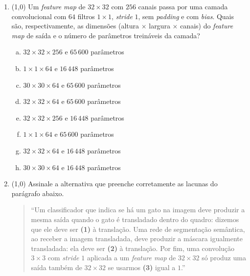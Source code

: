 \documentclass[11pt,a4paper]{article}
\begin{document}
\begin{enumerate}[1)]

\item (1{,}0) Um \textit{feature map} de $32 \times 32$ com $256$ canais passa por uma camada convolucional com $64$ filtros $1 \times 1$, \textit{stride} $1$, sem \textit{padding} e com \textit{bias}. Quais são, respectivamente, as dimensões (altura $\times$ largura $\times$ canais) do \textit{feature map} de saída e o número de parâmetros treináveis da camada?
\begin{enumerate}[a)]
    \item $32 \times 32 \times 256$ e $65\,600$ parâmetros
    \item $1 \times 1 \times 64$ e $16\,448$ parâmetros
    \item $30 \times 30 \times 64$ e $65\,600$ parâmetros
    \item $32 \times 32 \times 64$ e $65\,600$ parâmetros
    \item $32 \times 32 \times 256$ e $16\,448$ parâmetros
    \item $1 \times 1 \times 64$ e $65\,600$ parâmetros
    \item $32 \times 32 \times 64$ e $16\,448$ parâmetros
    \item $30 \times 30 \times 64$ e $16\,448$ parâmetros
\end{enumerate}

\item (1{,}0) Assinale a alternativa que preenche corretamente as lacunas do parágrafo abaixo.

\begin{quote}
``Um classificador que indica se há um gato na imagem deve produzir a mesma saída quando o gato é transladado dentro do quadro: dizemos que ele deve ser \textbf{(1)} à translação. Uma rede de segmentação semântica, ao receber a imagem transladada, deve produzir a máscara igualmente transladada: ela deve ser \textbf{(2)} à translação. Por fim, uma convolução $3 \times 3$ com \textit{stride} $1$ aplicada a um \textit{feature map} de $32 \times 32$ só produz uma saída também de $32 \times 32$ se usarmos \textbf{(3)} igual a $1$.''
\end{quote}


\end{enumerate}
\end{document}
